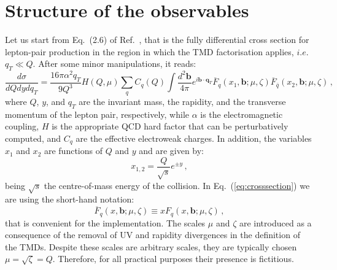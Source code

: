 \documentclass[10pt,a4paper]{article}
\begin{document}
\section{Structure of the observables}

Let us start from Eq.~(2.6) of Ref.~\cite{Scimemi:2017etj}, that is
the fully differential cross section for lepton-pair production in the
region in which the TMD factorisation applies, $i.e.$ $q_T \ll
Q$. After some minor manipulations, it reads:
\begin{equation}\label{eq:crosssection}
  \frac{d\sigma}{dQ dy dq_T} =
  \frac{16\pi\alpha^2q_T}{9 Q^3} H(Q,\mu) \sum_q C_q(Q)
  \int\frac{d^2\mathbf{b}}{4\pi} e^{i \mathbf{b}\cdot \mathbf{q}_T} \overline{F}_q(x_1,\mathbf{b};\mu,\zeta) \overline{F}_{\bar{q}}(x_2,\mathbf{b};\mu,\zeta)\,,
\end{equation}
where $Q$, $y$, and $q_T$ are the invariant mass, the rapidity, and
the transverse momentum of the lepton pair, respectively, while
$\alpha$ is the electromagnetic coupling, $H$ is the appropriate QCD
hard factor that can be perturbatively computed, and $C_q$ are the
effective electroweak charges. In addition, the variables $x_1$ and
$x_2$ are functions of $Q$ and $y$ and are given by:
\begin{equation}\label{eq:Bjorkenx12}
  x_{1,2} = \frac{Q}{\sqrt{s}}e^{\pm y}\,,
\end{equation}
being $\sqrt{s}$ the centre-of-mass energy of the collision. In
Eq.~(\ref{eq:crosssection}) we are using the short-hand notation:
\begin{equation}
\overline{F}_q(x,\mathbf{b};\mu,\zeta) \equiv xF_q(x,\mathbf{b};\mu,\zeta)\,,
\end{equation}
that is convenient for the implementation. The scales $\mu$ and
$\zeta$ are introduced as a consequence of the removal of UV and
rapidity divergences in the definition of the TMDs. Despite these
scales are arbitrary scales, they are typically chosen
$\mu=\sqrt{\zeta}=Q$. Therefore, for all practical purposes their
presence is fictitious.
\end{document}

